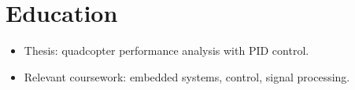\section{Education}
\begin{itemize}
  \item Thesis: quadcopter performance analysis with PID control.
  \item Relevant coursework: embedded systems, control, signal processing.
\end{itemize}
